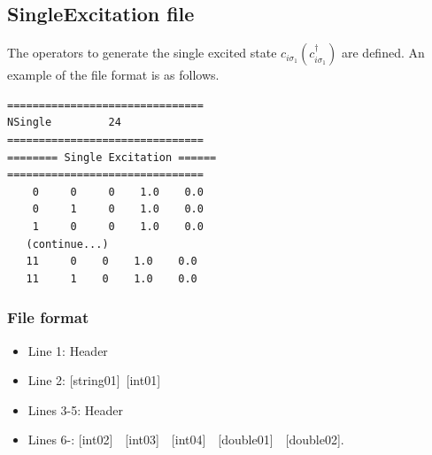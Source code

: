 \newpage
\subsection{{SingleExcitation file}}
\label{Subsec:singleexcitation}
The operators to generate the single excited state $c_{i\sigma_1}(c_{i\sigma_1}^{\dagger})$ are defined. An example of the file format is as follows.

\begin{minipage}{12.5cm}
\begin{screen}
\begin{verbatim}
===============================
NSingle         24
===============================
======== Single Excitation ======
===============================
    0     0     0    1.0    0.0
    0     1     0    1.0    0.0
    1     0     0    1.0    0.0
   (continue...)
   11     0    0    1.0    0.0
   11     1    0    1.0    0.0
\end{verbatim}
\end{screen}
\end{minipage}

\subsubsection{File format}
 \begin{itemize}
   \item  Line 1:  Header
   \item  Line 2:   [string01]~[int01]
   \item  Lines 3-5:  Header
   \item  Lines 6-: 
   [int02]~~[int03]~~[int04]~~[double01]~~[double02].
  \end{itemize}
